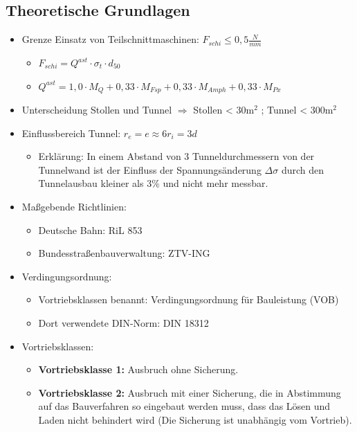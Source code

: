 \documentclass[fleqn,twoside]{article}
\begin{document}
\subsection{Theoretische Grundlagen}
\begin{itemize}
    \item Grenze Einsatz von Teilschnittmaschinen: $F_{schi} \leq 0,5 \frac{N}{mm}$
        \begin{itemize}
            \item $F_{schi}=Q^{ast} \cdot \sigma_t \cdot d_{50}$
            \item $Q^{ast}=1,0 \cdot M_Q + 0,33 \cdot M_{Fsp} + 0,33 \cdot M_{Amph} + 0,33 \cdot M_{Px}$
        \end{itemize}
    \item Unterscheidung Stollen und Tunnel $\Rightarrow$ Stollen < 30$\unit{\meter\squared}$ ; Tunnel < 300$\unit{\meter\squared}$
    \item Einflussbereich Tunnel: $r_e = e \approx 6r_i=3d$
    \begin{itemize}
        \item Erklärung: In einem Abstand von 3 Tunneldurchmessern von der Tunnelwand ist der Einfluss der Spannungsänderung $\Delta\sigma$ durch den Tunnelausbau kleiner als 3\% und nicht mehr messbar.
    \end{itemize}
    \item Maßgebende Richtlinien:
        \begin{itemize}
            \item Deutsche Bahn: RiL 853
            \item Bundesstraßenbauverwaltung: ZTV-ING
        \end{itemize}
    \item Verdingungsordnung:
        \begin{itemize}
            \item Vortriebsklassen benannt: Verdingungsordnung für Bauleistung (VOB)
            \item Dort verwendete DIN-Norm: DIN 18312
        \end{itemize}
    \item Vortriebsklassen:
        \begin{itemize}
            \item \textbf{Vortriebsklasse 1:} Ausbruch ohne Sicherung.
            \item \textbf{Vortriebsklasse 2:} Ausbruch mit einer Sicherung, die in Abstimmung auf das Bauverfahren so eingebaut werden muss, dass das Lösen und Laden nicht behindert wird (Die Sicherung ist unabhängig vom Vortrieb).

\end{itemize}
\end{itemize}
\end{document}
